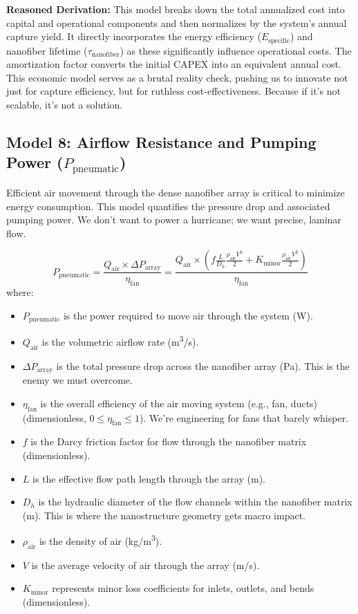 \documentclass[12pt]{article}
\begin{document}
\textbf{Reasoned Derivation:} This model breaks down the total annualized cost into capital and operational components and then normalizes by the system's annual capture yield. It directly incorporates the energy efficiency (\(E_{\text{specific}}\)) and nanofiber lifetime (\(\tau_{\text{nanofiber}}\)) as these significantly influence operational costs. The amortization factor converts the initial CAPEX into an equivalent annual cost. This economic model serves as a brutal reality check, pushing us to innovate not just for capture efficiency, but for ruthless cost-effectiveness. Because if it's not scalable, it's not a solution.

\subsection*{Model 8: Airflow Resistance and Pumping Power (\(P_{\text{pneumatic}}\))}
Efficient air movement through the dense nanofiber array is critical to minimize energy consumption. This model quantifies the pressure drop and associated pumping power. We don't want to power a hurricane; we want precise, laminar flow.

\begin{equation}
P_{\text{pneumatic}} = \frac{Q_{\text{air}} \times \Delta P_{\text{array}}}{\eta_{\text{fan}}} = \frac{Q_{\text{air}} \times \left( f \frac{L}{D_h} \frac{\rho_{\text{air}} V^2}{2} + K_{\text{minor}} \frac{\rho_{\text{air}} V^2}{2} \right)}{\eta_{\text{fan}}}
\label{eq:pumping_power}
\end{equation}
where:
\begin{itemize}
    \item \(P_{\text{pneumatic}}\) is the power required to move air through the system (W).
    \item \(Q_{\text{air}}\) is the volumetric airflow rate (m\textsuperscript{3}/s).
    \item \(\Delta P_{\text{array}}\) is the total pressure drop across the nanofiber array (Pa). This is the enemy we must overcome.
    \item \(\eta_{\text{fan}}\) is the overall efficiency of the air moving system (e.g., fan, ducts) (dimensionless, \(0 \le \eta_{\text{fan}} \le 1\)). We're engineering for fans that barely whisper.
    \item \(f\) is the Darcy friction factor for flow through the nanofiber matrix (dimensionless).
    \item \(L\) is the effective flow path length through the array (m).
    \item \(D_h\) is the hydraulic diameter of the flow channels within the nanofiber matrix (m). This is where the nanostructure geometry gets macro impact.
    \item \(\rho_{\text{air}}\) is the density of air (kg/m\textsuperscript{3}).
    \item \(V\) is the average velocity of air through the array (m/s).
    \item \(K_{\text{minor}}\) represents minor loss coefficients for inlets, outlets, and bends (dimensionless).
\end{itemize}
\end{document}

